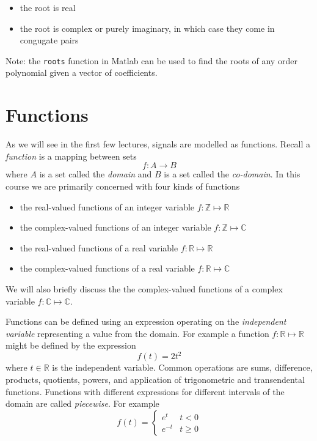 \begin{itemize}
\item the root is real
\item the root is complex or purely imaginary, in which case they come in congugate pairs 
\end{itemize}

Note: the \texttt{roots} function in Matlab can be used to find the roots of any order polynomial given a vector of coefficients.

\section{Functions}

As we will see in the first few lectures, signals are modelled as functions. Recall a \textit{function} is a mapping between sets
\[
f: A \rightarrow B
\]
where $A$ is a set called the {\it domain} and $B$ is a set called the {\it co-domain}. In this course we are primarily concerned with four kinds of functions

\begin{itemize}
\item the real-valued functions of an integer variable $f:\mathbb{Z}\mapsto\mathbb{R}$
\item the complex-valued functions of an integer variable $f:\mathbb{Z}\mapsto\mathbb{C}$
\item the real-valued functions of a real variable $f:\mathbb{R}\mapsto\mathbb{R}$
\item the complex-valued functions of a real variable $f:\mathbb{R}\mapsto\mathbb{C}$
\end{itemize}
We will also briefly discuss the the complex-valued functions of a complex variable $f:\mathbb{C}\mapsto\mathbb{C}$.

Functions can be defined using an expression operating on the \textit{independent variable} representing a value from the domain. For example a function $f:\mathbb{R}\mapsto\mathbb{R}$ might be defined by the expression
\[
f(t) = 2t^2
\]
where $t\in\mathbb{R}$ is the independent variable. Common operations are sums, difference, products, quotients, powers, and application of trigonometric and transendental functions. Functions with different expressions for different intervals of the domain are called \textit{piecewise}. For example
\[
f(t) = \left\{ \begin{array}{cc}
   e^{t} & t < 0\\
   e^{-t} & t \geq 0
\end{array}
\right.
\]

